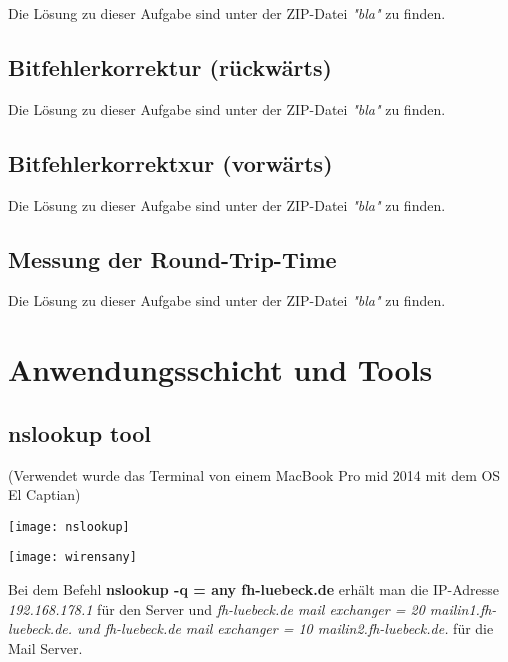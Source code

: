 \documentclass{scrartcl}
\begin{document}
 Die Lösung zu dieser Aufgabe sind unter der ZIP-Datei \textit{"bla"} zu finden.
 
 \subsection[Aufgabe 7 Bitfehlerkorrektur (rückwärts)]{Bitfehlerkorrektur (rückwärts)}

   Die Lösung zu dieser Aufgabe sind unter der ZIP-Datei \textit{"bla"} zu finden.
   
   \subsection[Aufgabe 8 Bitfehlerkorrektur (vorwärts)]{Bitfehlerkorrektxur (vorwärts)}
   
    Die Lösung zu dieser Aufgabe sind unter der ZIP-Datei \textit{"bla"} zu finden.
    
    \subsection[Aufgabe 9 Messung der Round-Trip-Time]{Messung der Round-Trip-Time}
    
     Die Lösung zu dieser Aufgabe sind unter der ZIP-Datei \textit{"bla"} zu finden.
  \newpage
\section[Versuch 3 Anwendungsschicht und Tools]{Anwendungsschicht und Tools}

  \subsection[Aufgabe 4 nslookup tool]{nslookup tool}
  
  (Verwendet wurde das Terminal von einem MacBook Pro mid 2014 mit dem OS El Captian)
 

    \texttt{[image: nslookup]}
    \label{fig:nslookup}

    \texttt{[image: wirensany]}
    \label{fig:wirensany}
 
  

  Bei dem Befehl \textbf{nslookup -q = any fh-luebeck.de} erhält man die IP-Adresse \textit{192.168.178.1} für den Server und \textit{fh-luebeck.de mail exchanger = 20 mailin1.fh-luebeck.de. und fh-luebeck.de mail exchanger = 10 mailin2.fh-luebeck.de.} für die Mail Server. 
  
\end{document}
